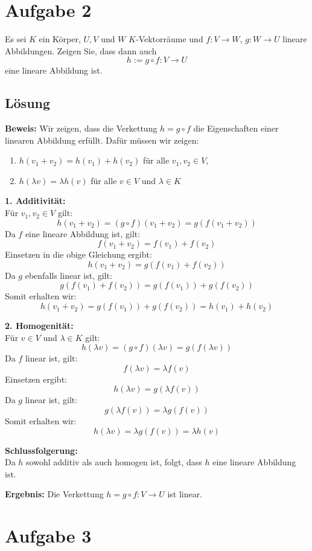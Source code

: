 \documentclass[11pt]{article}
\begin{document}
\section*{Aufgabe 2}

Es sei \( K \) ein Körper, \( U, V \) und \( W \) \( K \)-Vektorräume und \( f: V \to W \), \( g: W \to U \) lineare Abbildungen. Zeigen Sie, dass dann auch
\[
h := g \circ f : V \to U
\]
eine lineare Abbildung ist.

\subsection*{Lösung}

\textbf{Beweis:} Wir zeigen, dass die Verkettung \( h = g \circ f \) die Eigenschaften einer linearen Abbildung erfüllt. Dafür müssen wir zeigen:
\begin{enumerate}
    \item \( h(v_1 + v_2) = h(v_1) + h(v_2) \) für alle \( v_1, v_2 \in V \),
    \item \( h(\lambda v) = \lambda h(v) \) für alle \( v \in V \) und \( \lambda \in K \)
\end{enumerate}

\textbf{1. Additivität:} \\
Für \( v_1, v_2 \in V \) gilt:
\[
h(v_1 + v_2) = (g \circ f)(v_1 + v_2) = g(f(v_1 + v_2))
\]
Da \( f \) eine lineare Abbildung ist, gilt:
\[
f(v_1 + v_2) = f(v_1) + f(v_2)
\]
Einsetzen in die obige Gleichung ergibt:
\[
h(v_1 + v_2) = g(f(v_1) + f(v_2))
\]
Da \( g \) ebenfalls linear ist, gilt:
\[
g(f(v_1) + f(v_2)) = g(f(v_1)) + g(f(v_2))
\]
Somit erhalten wir:
\[
h(v_1 + v_2) = g(f(v_1)) + g(f(v_2)) = h(v_1) + h(v_2)
\]

\textbf{2. Homogenität:} \\
Für \( v \in V \) und \( \lambda \in K \) gilt:
\[
h(\lambda v) = (g \circ f)(\lambda v) = g(f(\lambda v))
\]
Da \( f \) linear ist, gilt:
\[
f(\lambda v) = \lambda f(v)
\]
Einsetzen ergibt:
\[
h(\lambda v) = g(\lambda f(v))
\]
Da \( g \) linear ist, gilt:
\[
g(\lambda f(v)) = \lambda g(f(v))
\]
Somit erhalten wir:
\[
h(\lambda v) = \lambda g(f(v)) = \lambda h(v)
\]

\textbf{Schlussfolgerung:} \\
Da \( h \) sowohl additiv als auch homogen ist, folgt, dass \( h \) eine lineare Abbildung ist.

\textbf{Ergebnis:} Die Verkettung \( h = g \circ f : V \to U \) ist linear.


\section*{Aufgabe 3}
\end{document}
